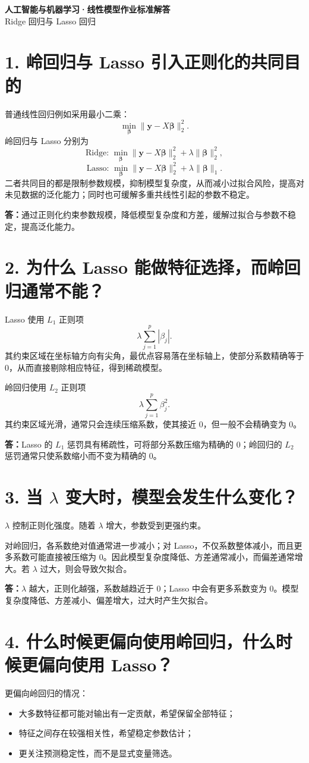 \documentclass[UTF8,a4paper,11pt]{ctexart}
\begin{document}
\begin{center}
{\LARGE\bfseries 人工智能与机器学习·线性模型作业标准解答}\\[4pt]
{\large Ridge 回归与 Lasso 回归}
\end{center}

\section*{1. 岭回归与 Lasso 引入正则化的共同目的}
普通线性回归例如采用最小二乘：
\[
\min_{\bm\beta}\|\bm y-X\bm\beta\|_2^2.
\]
岭回归与 Lasso 分别为
\[
\text{Ridge: }\min_{\bm\beta}\|\bm y-X\bm\beta\|_2^2+\lambda\|\bm\beta\|_2^2,
\]
\[
\text{Lasso: }\min_{\bm\beta}\|\bm y-X\bm\beta\|_2^2+\lambda\|\bm\beta\|_1.
\]
二者共同目的都是限制参数规模，抑制模型复杂度，从而减小过拟合风险，提高对未见数据的泛化能力；同时也可缓解多重共线性引起的参数不稳定。

\textbf{答：}通过正则化约束参数规模，降低模型复杂度和方差，缓解过拟合与参数不稳定，提高泛化能力。

\section*{2. 为什么 Lasso 能做特征选择，而岭回归通常不能？}
Lasso 使用 $L_1$ 正则项
\[
\lambda\sum_{j=1}^{p}|\beta_j|.
\]
其约束区域在坐标轴方向有尖角，最优点容易落在坐标轴上，使部分系数精确等于 0，从而直接剔除相应特征，得到稀疏模型。

岭回归使用 $L_2$ 正则项
\[
\lambda\sum_{j=1}^{p}\beta_j^2.
\]
其约束区域光滑，通常只会连续压缩系数，使其接近 0，但一般不会精确变为 0。

\textbf{答：}Lasso 的 $L_1$ 惩罚具有稀疏性，可将部分系数压缩为精确的 0；岭回归的 $L_2$ 惩罚通常只使系数缩小而不变为精确的 0。

\section*{3. 当 $\lambda$ 变大时，模型会发生什么变化？}
$\lambda$ 控制正则化强度。随着 $\lambda$ 增大，参数受到更强约束。

对岭回归，各系数绝对值通常进一步减小；对 Lasso，不仅系数整体减小，而且更多系数可能直接被压缩为 0。因此模型复杂度降低、方差通常减小，而偏差通常增大。若 $\lambda$ 过大，则会导致欠拟合。

\textbf{答：}$\lambda$ 越大，正则化越强，系数越趋近于 0；Lasso 中会有更多系数变为 0。模型复杂度降低、方差减小、偏差增大，过大时产生欠拟合。

\section*{4. 什么时候更偏向使用岭回归，什么时候更偏向使用 Lasso？}
更偏向岭回归的情况：
\begin{itemize}[leftmargin=2em]
\item 大多数特征都可能对输出有一定贡献，希望保留全部特征；
\item 特征之间存在较强相关性，希望稳定参数估计；
\item 更关注预测稳定性，而不是显式变量筛选。
\end{itemize}
\end{document}
